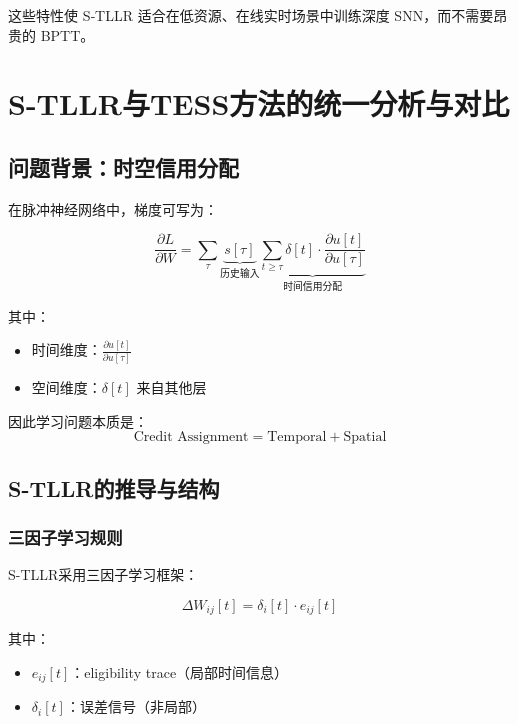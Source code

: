 \documentclass[journal,12pt,onecolumn]{IEEEtran}
\begin{document}
这些特性使 S‑TLLR 适合在低资源、在线实时场景中训练深度 SNN，而不需要昂贵的 BPTT。


\section{S-TLLR与TESS方法的统一分析与对比}

\subsection{问题背景：时空信用分配}

在脉冲神经网络中，梯度可写为：

\begin{equation}
\frac{\partial L}{\partial W}
=
\sum_{\tau}
\underbrace{s[\tau]}_{\text{历史输入}}
\underbrace{\sum_{t \ge \tau} \delta[t] \cdot \frac{\partial u[t]}{\partial u[\tau]}}_{\text{时间信用分配}}
\end{equation}

其中：
\begin{itemize}
\item 时间维度：$\frac{\partial u[t]}{\partial u[\tau]}$
\item 空间维度：$\delta[t]$ 来自其他层
\end{itemize}

因此学习问题本质是：
\begin{equation}
\text{Credit Assignment} = \text{Temporal} + \text{Spatial}
\end{equation}



\subsection{S-TLLR的推导与结构}

\subsubsection{三因子学习规则}

S-TLLR采用三因子学习框架：

\begin{equation}
\Delta W_{ij}[t] = \delta_i[t] \cdot e_{ij}[t]
\end{equation}

其中：
\begin{itemize}
\item $e_{ij}[t]$：eligibility trace（局部时间信息）
\item $\delta_i[t]$：误差信号（非局部）
\end{itemize}
\end{document}
